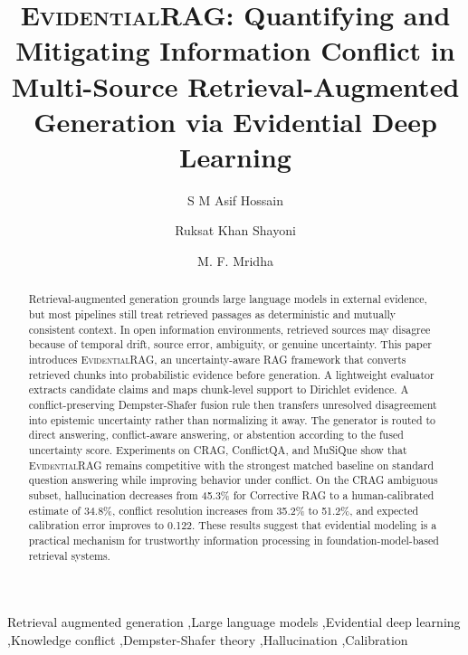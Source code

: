 \documentclass[preprint,12pt,authoryear,nopreprintline]{elsarticle}
\newcommand{\ERAG}{\textsc{EvidentialRAG}}
\begin{document}
\begin{frontmatter}

\title{\ERAG{}: Quantifying and Mitigating Information Conflict in Multi-Source Retrieval-Augmented Generation via Evidential Deep Learning}

\author[wsu]{S M Asif Hossain}

\author[wsu]{Ruksat Khan Shayoni}

\author[aiub]{M. F. Mridha}





\begin{abstract}
Retrieval-augmented generation grounds large language models in external evidence, but most pipelines still treat retrieved passages as deterministic and mutually consistent context. In open information environments, retrieved sources may disagree because of temporal drift, source error, ambiguity, or genuine uncertainty. This paper introduces \ERAG{}, an uncertainty-aware RAG framework that converts retrieved chunks into probabilistic evidence before generation. A lightweight evaluator extracts candidate claims and maps chunk-level support to Dirichlet evidence. A conflict-preserving Dempster-Shafer fusion rule then transfers unresolved disagreement into epistemic uncertainty rather than normalizing it away. The generator is routed to direct answering, conflict-aware answering, or abstention according to the fused uncertainty score. Experiments on CRAG, ConflictQA, and MuSiQue show that \ERAG{} remains competitive with the strongest matched baseline on standard question answering while improving behavior under conflict. On the CRAG ambiguous subset, hallucination decreases from 45.3\% for Corrective RAG to a human-calibrated estimate of 34.8\%, conflict resolution increases from 35.2\% to 51.2\%, and expected calibration error improves to 0.122. These results suggest that evidential modeling is a practical mechanism for trustworthy information processing in foundation-model-based retrieval systems.
\end{abstract}


\begin{keyword}
Retrieval augmented generation \sep Large language models \sep Evidential deep learning \sep Knowledge conflict \sep Dempster-Shafer theory \sep Hallucination \sep Calibration
\end{keyword}

\end{frontmatter}
\end{document}

